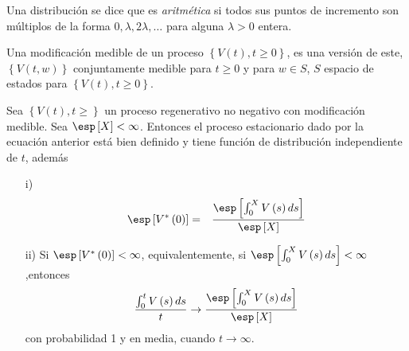 \begin{Def}
Una distribuci\'on se dice que es {\emph{aritm\'etica}} si todos sus puntos de incremento son m\'ultiplos de la forma $0,\lambda, 2\lambda,\ldots$ para alguna $\lambda>0$ entera.
\end{Def}


\begin{Def}
Una modificaci\'on medible de un proceso $\left\{V\left(t\right),t\geq0\right\}$, es una versi\'on de este, $\left\{V\left(t,w\right)\right\}$ conjuntamente medible para $t\geq0$ y para $w\in S$, $S$ espacio de estados para $\left\{V\left(t\right),t\geq0\right\}$.
\end{Def}

\begin{Teo}
Sea $\left\{V\left(t\right),t\geq\right\}$ un proceso regenerativo no negativo con modificaci\'on medible. Sea $\esp\left[X\right]<\infty$. Entonces el proceso estacionario dado por la ecuaci\'on anterior est\'a bien definido y tiene funci\'on de distribuci\'on independiente de $t$, adem\'as
\begin{itemize}
\item[i)] \begin{eqnarray*}
\esp\left[V^{*}\left(0\right)\right]&=&\frac{\esp\left[\int_{0}^{X}V\left(s\right)ds\right]}{\esp\left[X\right]}\end{eqnarray*}
\item[ii)] Si $\esp\left[V^{*}\left(0\right)\right]<\infty$, equivalentemente, si $\esp\left[\int_{0}^{X}V\left(s\right)ds\right]<\infty$,entonces
\begin{eqnarray*}
\frac{\int_{0}^{t}V\left(s\right)ds}{t}\rightarrow\frac{\esp\left[\int_{0}^{X}V\left(s\right)ds\right]}{\esp\left[X\right]}
\end{eqnarray*}
con probabilidad 1 y en media, cuando $t\rightarrow\infty$.
\end{itemize}
\end{Teo}
%




